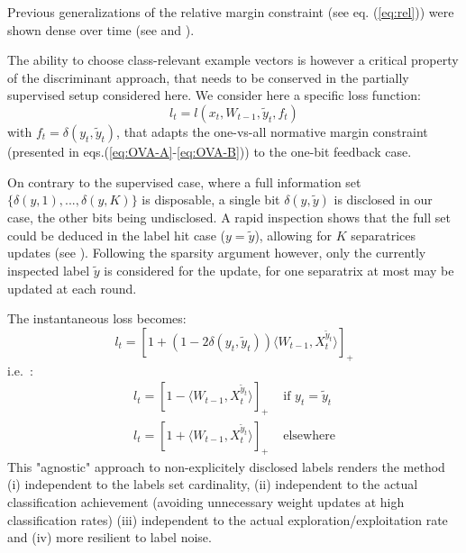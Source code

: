 \documentclass[preprint,12pt,authoryear]{elsarticle}
\begin{document}
{\color{green} Previous generalizations of the relative margin constraint (see eq. (\ref{eq:rel})) were shown dense over time (see \cite{kakade2008efficient} and \cite{zhong2015esann}).} 

The ability to choose class-relevant example vectors is however a critical property of the discriminant approach, that needs to be conserved in the partially supervised setup considered here. 
We consider here a specific loss function:
$$l_t = l(x_t,W_{t-1},\tilde{y}_t,f_t)$$
with $f_t = \delta(y_t,\tilde{y}_t)$,
that adapts the one-vs-all normative margin constraint (presented in eqs.(\ref{eq:OVA-A}-\ref{eq:OVA-B})) to the one-bit feedback case. 

On contrary to the supervised case, where a full information set $\{\delta(y,1), ..., \delta(y,K)\}$ is disposable, a single bit $\delta(y,\tilde{y})$ is disclosed in our case, the other bits being undisclosed. 
A rapid inspection shows that the full set could be deduced in the label hit case ($y = \tilde{y}$), allowing for $K$ separatrices updates (see \cite{chen2009beyond}). Following the sparsity argument however,
only the  currently inspected label $\tilde{y}$ is  considered  for the update, for one separatrix at most may be updated at each round. 

The instantaneous loss becomes:
\begin{equation}\label{eq:loss}
l_t = [1 + (1 - 2 \delta(y_t,\tilde{y}_t)) \langle W_{t-1}, X_t^{\tilde{y}_t}\rangle]_+
\end{equation}
i.e.~:
\begin{align}
	l_t = [1 - \langle W_{t-1}, X_t^{\tilde{y}_t}\rangle]_+ &\text{ if }y_t=\tilde{y}_t\label{eq:loss-A}\\
	l_t = [1 + \langle W_{t-1}, X_t^{\tilde{y}_t}\rangle]_+ &\text{ elsewhere} \label{eq:loss-B}
\end{align}
{\color{blue} This "agnostic" approach to non-explicitely disclosed labels %
renders the method (i) independent to the labels set cardinality, (ii) independent to the actual classification achievement (avoiding unnecessary weight updates at high classification rates) (iii) independent to the actual exploration/exploitation rate and (iv) more resilient to label noise.}
\end{document}
